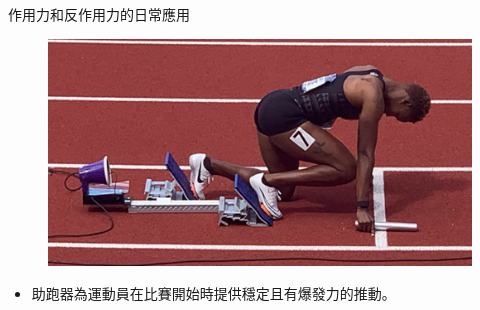 \documentclass[beamer=true]{standalone}
\begin{document}
\begin{frame}{作用力和反作用力的日常應用}
    \begin{figure}[h!]
        \centering
        \includegraphics[width=.8\textwidth]{assets/60a0e41a.png}
    \end{figure}
    \begin{itemize}
        \item 助跑器為運動員在比賽開始時提供穩定且有爆發力的推動。
    \end{itemize}
\end{frame}
\end{document}

